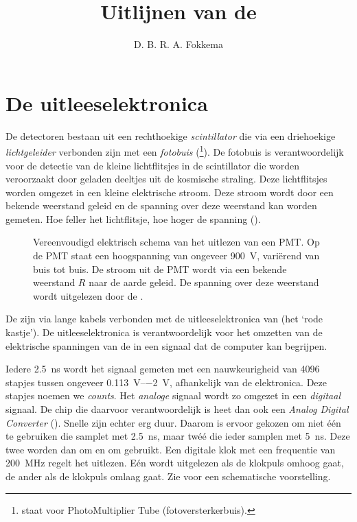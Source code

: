 


\title{Uitlijnen van de \adcs}
\author{D. B. R. A. Fokkema}




\maketitle

\section{De \hisparc uitleeselektronica}

De \hisparc detectoren bestaan uit een rechthoekige \emph{scintillator}
die via een driehoekige \emph{lichtgeleider} verbonden zijn met een
\emph{fotobuis} (\pmt \footnote{\pmt staat voor PhotoMultiplier Tube
(fotoversterkerbuis).}).  De fotobuis is verantwoordelijk voor de detectie
van de kleine lichtflitsjes in de scintillator die worden veroorzaakt door
geladen deeltjes uit de kosmische straling.  Deze lichtflitsjes worden
omgezet in een kleine elektrische stroom.  Deze stroom wordt door een
bekende weerstand geleid en de spanning over deze weerstand kan worden
gemeten.  Hoe feller het lichtflitsje, hoe hoger de spanning
().

\begin{figure}
\centering

\caption{Vereenvoudigd elektrisch schema van het uitlezen van een PMT.  Op
de PMT staat een hoogspanning van ongeveer \SI{900}{\volt}, variërend van
buis tot buis.  De stroom uit de PMT wordt via een bekende weerstand $R$
naar de aarde geleid.  De spanning over deze weerstand wordt uitgelezen
door de \adcs.}
\label{fig:schema-pmt}
\end{figure}

De \pmts zijn via lange kabels verbonden met de uitleeselektronica van
\hisparc (het `rode kastje').  De uitleeselektronica is verantwoordelijk
voor het omzetten van de elektrische spanningen van de \pmts in een
signaal dat de computer kan begrijpen.

Iedere \SI{2.5}{\nano\second} wordt het signaal gemeten met een
nauwkeurigheid van \num{4096} stapjes tussen ongeveer
\SIrange{+0.113}{-2}{\volt}, afhankelijk van de elektronica.  Deze stapjes
noemen we \emph{\adc counts}.  Het \emph{analoge} signaal wordt zo omgezet
in een \emph{digitaal} signaal.  De chip die daarvoor verantwoordelijk is
heet dan ook een \emph{Analog Digital Converter} (\adc).  Snelle \adcs
zijn echter erg duur.  Daarom is ervoor gekozen om niet één \adc te
gebruiken die samplet met \SI{2.5}{\nano\second}, maar twéé \adcs die
ieder samplen met \SI{5}{\nano\second}.  Deze twee \adcs worden dan om en
om gebruikt.  Een digitale klok met een frequentie van
\SI{200}{\mega\hertz} regelt het uitlezen.  Eén \adc wordt uitgelezen als
de klokpuls omhoog gaat, de ander als de klokpuls omlaag gaat.  Zie
 voor een schematische voorstelling.

